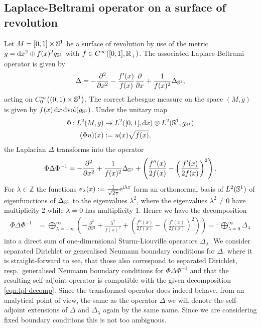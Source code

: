 \subsection{Laplace-Beltrami operator on a surface of revolution}
\label{sec:laplace-beltrami}
Let $M = [0,1]\times\Sphere{1}$ be a surface of revolution by use of the metric
$g = \mathrm dx^2 \oplus f(x)^2 g_\Sphere{1}$ with $f\in \Cinf([0,1],
\Rplus)$. The associated Laplace-Beltrami operator is given by
\begin{align}
  \Delta = -\frac{\partial^2}{\partial x^2} -
            \frac{f'(x)}{f(x)}\frac{\partial}{\partial x} +
            \frac{1}{f(x)^2}\Delta_\Sphere1,
\end{align}
acting on $\Cinf[0]\bigl((0,1)\times\Sphere1\bigr)$. The correct Lebesgue
measure on the space $(M,g)$ is given by $f(x)\,\mathrm dx\, \mathrm
d\!\vol(g_\Sphere1)$. Under the unitary map
\begin{align*}
  \Phi\colon L^2(M, g)&\to L^2([0,1], \mathrm dx)\otimes L^2(\Sphere1,
  g_\Sphere1) \\ (\Phi u)(x) &:= u(x) \sqrt{f(x)},
\end{align*}
the Laplacian $\Delta$ transforms into the operator
\begin{align*}
  \Phi\Delta\Phi^{-1} = -\frac{\partial^2}{\partial x^2} +
  \frac{1}{f(x)^2}\Delta_\Sphere1 + \left( \frac{f''(x)}{2f(x)} -
  \left(\frac{f'(x)}{2f(x)}\right)^2\right).
\end{align*}
For $\lambda\in\mathbb{Z}$ the functions $e_\lambda(x) :=
\frac{1}{\sqrt{2\pi}}\Eto{\mathrm i\lambda x}$ form an orthonormal basis of
$L^2(\Sphere1)$ of eigenfunctions of $\Delta_\Sphere1$ to the eigenvalues
$\lambda^2$, where the eigenvalues $\lambda^2 \neq 0$ have multiplicity 2 while
$\lambda = 0$ has multiplicity 1. Hence we have the decomposition
\begin{align}
  \label{eqn:lpl-decomp}
  \Phi\Delta\Phi^{-1} &= \bigoplus_{\lambda=-\infty}^{\infty} \left(
    -\frac{\partial^2}{\partial x^2} + \frac{\lambda^2}{f(x)^2} + 
     \left( \frac{f''(x)}{2f(x)} -
     \left(\frac{f'(x)}{2f(x)}\right)^2\right)\right)
     =: \bigoplus_{\lambda=0}^{\infty}\Delta_\lambda
\end{align}
into a direct sum of one-dimensional Sturm-Liouville operators $\Delta_\lambda$.
We consider separated Dirichlet or generalised Neumann boundary conditions for
$\Delta$, where it is straight-forward to see, that those also correspond to
separated Dirichlet, resp.\ generalised Neumann boundary conditions for
$\Phi\Delta\Phi^{-1}$ and that the resulting self-adjoint operator is compatible
with the given decomposition \eqref{eqn:lpl-decomp}. Since the transformed
operator does indeed behave, from an analytical point of view, the same as the
operator $\Delta$ we will denote the self-adjoint extensions of $\Delta$ and
$\Delta_\lambda$ again by the same name. Since we are considering fixed boundary
conditions this is not too ambiguous.

